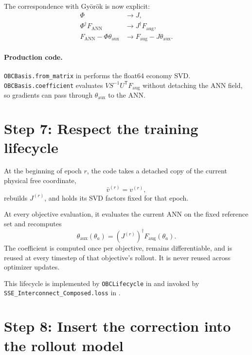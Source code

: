 \documentclass[11pt,a4paper]{article}
\newcommand{\T}{\mathsf{T}}
\newcommand{\code}[1]{\texttt{#1}}
\begin{document}
The correspondence with Gy\"or\"ok is now explicit:
\begin{equation}
\begin{aligned}
\Phi
&\longrightarrow J,\\
\Phi^\dagger F_{\mathrm{ANN}}
&\longrightarrow J^\dagger F_{\mathrm{aug}},\\
F_{\mathrm{ANN}}-\Phi\theta_{\mathrm{aux}}
&\longrightarrow F_{\mathrm{aug}}-J\theta_{\mathrm{aux}}.
\end{aligned}
\end{equation}

\paragraph{Production code.}
\code{OBCBasis.from\_matrix} in
 performs the float64 economy
SVD.  \code{OBCBasis.coefficient} evaluates
\(VS^{-1}U^\T F_{\mathrm{aug}}\) without detaching the ANN field, so gradients
can pass through \(\theta_{\mathrm{aux}}\) to the ANN.

\section{Step 7: Respect the training lifecycle}

At the beginning of epoch \(r\), the code takes a detached copy of the current
physical free coordinate,
\begin{equation}
\bar v^{(r)}=v^{(r)},
\end{equation}
rebuilds \(J^{(r)}\), and holds its SVD factors fixed for that epoch.

At every objective evaluation, it evaluates the current ANN on the fixed
reference set and recomputes
\begin{equation}
\theta_{\mathrm{aux}}(\theta_a)
=(J^{(r)})^\dagger F_{\mathrm{aug}}(\theta_a).
\end{equation}
The coefficient is computed once per objective, remains differentiable, and is
reused at every timestep of that objective's rollout.  It is never reused
across optimizer updates.

This lifecycle is implemented by \code{OBCLifecycle} in
 and invoked by
\code{SSE\_Interconnect\_Composed.loss} in
.

\clearpage
\section{Step 8: Insert the correction into the rollout model}
\end{document}

